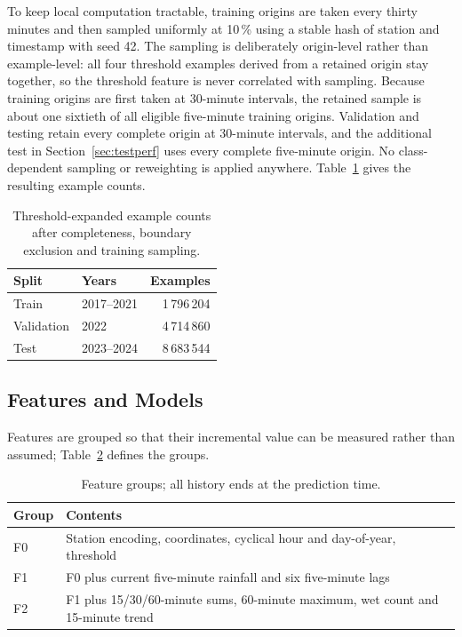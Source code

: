 \documentclass[10pt,a4paper,twocolumn,twoside]{rho-class/rho}
\begin{document}
To keep local computation tractable, training origins are taken every thirty minutes and then sampled uniformly at 10\,\% using a stable hash of station and timestamp with seed 42. The sampling is deliberately origin-level rather than example-level: all four threshold examples derived from a retained origin stay together, so the threshold feature is never correlated with sampling. Because training origins are first taken at 30-minute intervals, the retained sample is about one sixtieth of all eligible five-minute training origins. Validation and testing retain every complete origin at 30-minute intervals, and the additional test in Section~\ref{sec:testperf} uses every complete five-minute origin. No class-dependent sampling or reweighting is applied anywhere. Table~\ref{tab:splits} gives the resulting example counts.

\begin{table}[H]
\caption{Threshold-expanded example counts after completeness, boundary exclusion and training sampling.}
\label{tab:splits}
\centering
\small
\setlength{\tabcolsep}{3pt}
\begin{tabular}{llr}
\toprule
\textbf{Split} & \textbf{Years} & \textbf{Examples} \\
\midrule
Train & 2017--2021 & 1\,796\,204 \\
Validation & 2022 & 4\,714\,860 \\
Test & 2023--2024 & 8\,683\,544 \\
\bottomrule
\end{tabular}
\end{table}

\subsection{Features and Models}
Features are grouped so that their incremental value can be measured rather than assumed; Table~\ref{tab:features} defines the groups.

\begin{table}[H]
\caption{Feature groups; all history ends at the prediction time.}
\label{tab:features}
\centering
\small
\setlength{\tabcolsep}{3pt}
\begin{tabular}{p{}p{}}
\toprule
\textbf{Group} & \textbf{Contents} \\
\midrule
F0 & Station encoding, coordinates, cyclical hour and day-of-year, threshold \\
F1 & F0 plus current five-minute rainfall and six five-minute lags \\
F2 & F1 plus 15/30/60-minute sums, 60-minute maximum, wet count and 15-minute trend \\
\bottomrule
\end{tabular}
\end{table}
\end{document}
